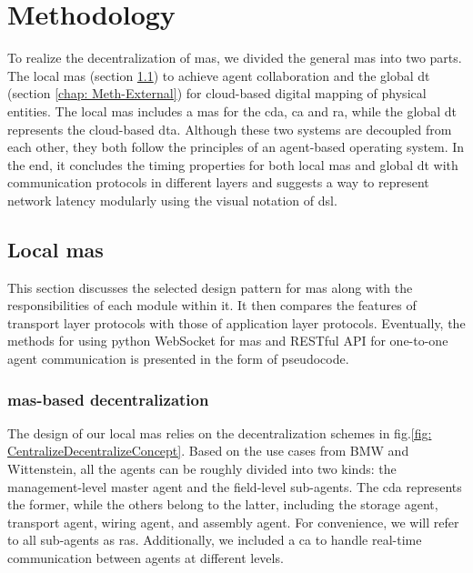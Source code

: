 \chapter{Methodology}\label{chap: Meth}%
To realize the decentralization of \gls{mas}, we divided the general \gls{mas} into 
two parts. The local \gls{mas} (section \ref{chap: Meth-Internal}) to achieve agent 
collaboration and the global \gls{dt} (section \ref{chap: Meth-External})
for cloud-based digital mapping of physical entities. The local \gls{mas} 
includes a \gls{mas} for the \gls{cda}, \gls{ca} and \gls{ra}, 
while the global \gls{dt} represents the cloud-based \gls{dta}. 
Although these two systems are decoupled from each other, 
they both follow the principles of an agent-based operating system. 
In the end, it concludes the timing properties for both 
local \gls{mas} and global \gls{dt} with communication protocols in 
different layers and suggests a way to represent 
network latency modularly using the visual notation of \gls{dsl}. 




\section{Local \gls{mas}}\label{chap: Meth-Internal}%

This section discusses the selected design pattern for \gls{mas} along 
with the responsibilities of each module within it.
It then compares the features of transport layer protocols with those of 
application layer protocols.
Eventually, the methods for using python WebSocket for \gls{mas} and 
RESTful API for one-to-one agent communication is presented in the form of pseudocode. 


\subsection{\gls{mas}-based decentralization}
The design of our local \gls{mas} relies on the decentralization 
schemes in fig.\ref{fig: CentralizeDecentralizeConcept}. 
Based on the use cases from BMW and Wittenstein, all the agents can be roughly 
divided into two kinds: the management-level master agent and the field-level sub-agents. 
The \gls{cda} represents the former, while the others belong to the latter, 
including the storage agent, transport agent, wiring agent, and assembly agent. For 
convenience, we will refer to all sub-agents as \gls{ras}. Additionally, we included 
a \gls{ca} to handle real-time communication between agents at different levels. 


